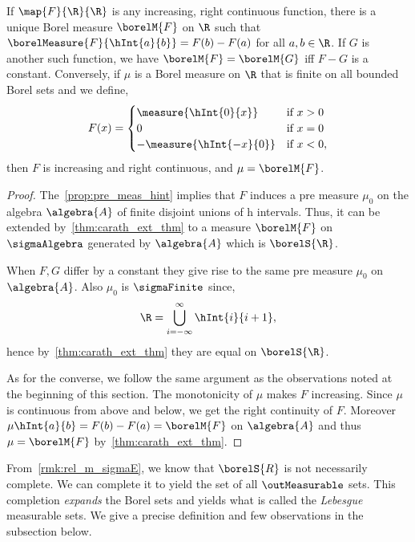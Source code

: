\begin{Theorem}[name=Borel measure on the real line]\label{thm:borel_measure_R}
    If $\map{F}{\R}{\R}$ is any increasing, right continuous function, there is a unique Borel
    measure $\borelM{F}$ on $\R$ such that $\borelMeasure{F}{\hInt{a}{b}} = F(b) - F(a)$ for all
    $a,b \in \R$. If $G$ is another such function, we have $\borelM{F} = \borelM{G}$ iff $F-G$ is a
    constant. Conversely, if $\mu$ is a Borel measure on $\R$ that is finite on all bounded Borel
    sets and we define,
    \begin{equation*}
	F(x) =
	\begin{cases}
	    \measure{\hInt{0}{x}} &\text{if $x > 0$}\\
	    0 &\text{if $x = 0$} \\
	    -\measure{\hInt{-x}{0}} &\text{if $x < 0$},
	\end{cases}
    \end{equation*}	
    then $F$ is increasing and right continuous, and $\mu = \borelM{F}$.
\end{Theorem}
\begin{proof}
    The~\ref{prop:pre_meas_hint} implies that $F$ induces a pre measure $\mu_0$ 
    on the algebra $\algebra{A}$ of finite disjoint unions of h intervals. Thus, it can be 
    extended by~\ref{thm:carath_ext_thm} to a measure $\borelM{F}$ on $\sigmaAlgebra$ 
    generated by $\algebra{A}$ which is $\borelS{\R}$. 

    When $F,G$ differ by a constant they give rise to the same pre measure $\mu_0$ on $\algebra{A}$.
    Also $\mu_0$ is $\sigmaFinite$ since,
    \[\R = \bigcup\limits_{i = -\infty}^{\infty}\hInt{i}{i+1},\]
    hence by~\ref{thm:carath_ext_thm} they are equal on $\borelS{\R}$.

    As for the converse, we follow the same argument as the observations noted at the beginning of
    this section. The monotonicity of $\mu$ makes $F$ increasing. Since $\mu$ is continuous from
    above and below, we get the right continuity of $F$. Moreover $\mu\hInt{a}{b} = F(b) - F(a) =
    \borelM{F}$ on $\algebra{A}$ and thus $\mu = \borelM{F}$ by~\ref{thm:carath_ext_thm}.

\end{proof}
\begin{Remark}
    From~\ref{rmk:rel_m_sigmaE}, we know that $\borelS{R}$ is not necessarily complete. We can
    complete it to yield the set of all $\outMeasurable$ sets. This completion \emph{expands} the
    Borel sets and yields what is called the \emph{Lebesgue} measurable sets. We give a precise
    definition and few observations in the subsection below. 
\end{Remark}

